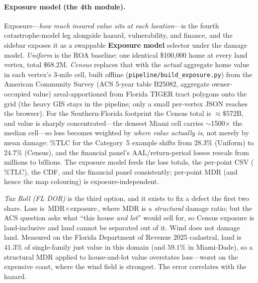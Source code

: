 \documentclass[11pt]{article}
\begin{document}
\paragraph{Exposure model (the 4th module).}
Exposure---\emph{how much insured value sits at each location}---is the fourth
catastrophe-model leg alongside hazard, vulnerability, and finance, and the sidebar
exposes it as a swappable \textbf{Exposure model} selector under the damage model.
\emph{Uniform} is the ROA baseline: one identical \$100{,}000 home at every land
vertex, total $\$68.2$M. \emph{Census} replaces that with the \emph{actual}
aggregate home value in each vertex's 3-mile cell, built offline
(\texttt{pipeline/build\_exposure.py}) from the American Community Survey (ACS
5-year table B25082, aggregate owner-occupied value) areal-apportioned from Florida
TIGER tract polygons onto the grid (the heavy GIS stays in the pipeline; only a
small per-vertex JSON reaches the browser). For the Southern-Florida footprint the
Census total is $\approx\$572$B, and value is sharply concentrated---the densest
Miami cell carries $\sim$1500$\times$ the median cell---so loss becomes weighted by
\emph{where value actually is}, not merely by mean damage: $\%\text{TLC}$ for the
Category~5 example shifts from $28.3\%$ (Uniform) to $24.7\%$ (Census), and the
financial panel's AAL/return-period losses rescale from millions to billions. The
exposure model feeds the loss totals, the per-point CSV ($\%\text{TLC}$), the
CDF, and the financial panel consistently; per-point MDR (and hence the map
colouring) is exposure-independent.

\emph{Tax Roll (FL DOR)} is the third option, and it exists to fix a defect the first
two share. Loss is $\text{MDR}\times\text{exposure}$, where MDR is a \emph{structural}
damage ratio; but the ACS question asks what ``this house \emph{and lot}'' would sell
for, so Census exposure is land-inclusive and land cannot be separated out of it. Wind
does not damage land. Measured on the Florida Department of Revenue 2025 cadastral, land
is $41.3\%$ of single-family just value in this domain (and $59.1\%$ in Miami-Dade), so
a structural MDR applied to house-and-lot value overstates loss---worst on the expensive
coast, where the wind field is strongest. The error correlates with the hazard.
\end{document}
